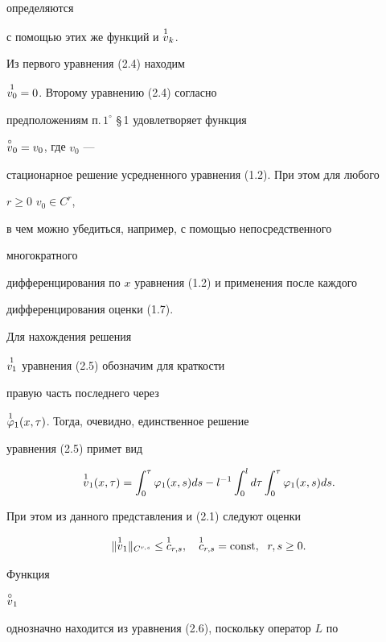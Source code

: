 определяются 


с помощью этих же функций и $\overset{1}{v}{}_k$. 


 


Из первого уравнения (2.4) находим 


$\overset{1}{v_0}{}=0$. Второму уравнению (2.4) согласно 


предположениям п.\,$1^\circ$ \S\,1 удовлетворяет функция 


$\overset{\circ}{v}{}_0=v_0$, где $v_0$ --- 


стационарное решение усредненного уравнения (1.2). При этом для любого 


$r\ge0$\; $v_0\in C^r$, 


в чем можно убедиться, например, с помощью непосредственного 


многократного 


дифференцирования по $x$ уравнения (1.2) и применения после каждого 


дифференцирования оценки (1.7). 


 


Для нахождения решения 


$\overset{1}{v_1}{}$ уравнения (2.5) обозначим для краткости 


правую часть последнего через 


$\overset{1}{\varphi}{}_1(x,\tau)$. Тогда, очевидно, единственное решение 


уравнения (2.5) примет вид 


$$ 


\up{1}{v}_1(x,\tau)=\int^\tau_0 \varphi_1(x,s)ds- 


l^{-1}\int^l_0d\tau\int^\tau_0 \varphi_1(x,s)ds. 


$$ 


При этом из данного представления и (2.1) следуют оценки 


\begin{equation} 


\|\up{1}{v}_1\|_{C^{r,s}}\le\up{1}{c}_{r,s},\quad 


\up{1}{c}_{r,s}=\const,\ \; r,s\ge0. 


\end{equation} 


 


Функция 


$\overset{\circ}{v}{}_1$ 


однозначно находится из уравнения (2.6), поскольку оператор $L$ по 


